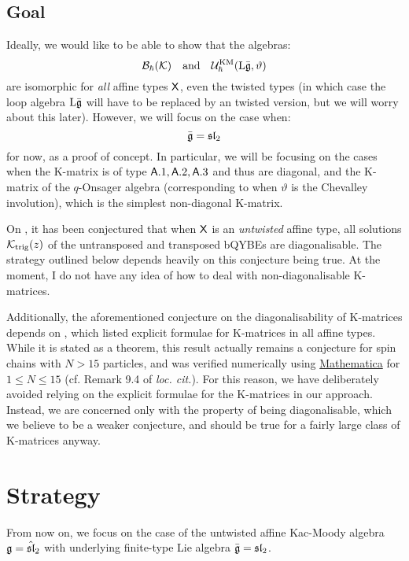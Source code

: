         \subsection{Goal}
            Ideally, we would like to be able to show that the algebras:
                $$\mathcal{B}_{\hbar}(\mathcal{K}) \quad \text{and} \quad \mathcal{U}_{\hbar}^{\mathrm{KM}}(\mathrm{L} \bar{\mathfrak{g}}, \vartheta)$$
            are isomorphic for \textit{all} affine types $\mathsf{X}$, even the twisted types (in which case the loop algebra $\mathrm{L} \bar{\mathfrak{g}}$ will have to be replaced by an twisted version, but we will worry about this later). However, we will focus on the case when:
                $$\bar{\mathfrak{g}} = \mathfrak{sl}_2$$
            for now, as a proof of concept. In particular, we will be focusing on the cases when the K-matrix is of type $\mathsf{A}.1, \mathsf{A}.2, \mathsf{A}.3$ and thus are diagonal, and the K-matrix of the $q$-Onsager algebra (corresponding to when $\vartheta$ is the Chevalley involution), which is the simplest non-diagonal K-matrix.
            \begin{remark}
                On \cite[p. 60]{regelskis_vlaar_reflection_matrices_coideal_subalgebras}, it has been conjectured that when $\mathsf{X}$ is an \textit{untwisted} affine type, all solutions $\mathcal{K}_{\mathrm{trig}}(z)$ of the untransposed and transposed bQYBEs are diagonalisable. The strategy outlined below depends heavily on this conjecture being true. At the moment, I do not have any idea of how to deal with non-diagonalisable K-matrices.

                Additionally, the aforementioned conjecture on the diagonalisability of K-matrices depends on \cite[Theorem 9.3]{regelskis_vlaar_reflection_matrices_coideal_subalgebras}, which listed explicit formulae for K-matrices in all affine types. While it is stated as a theorem, this result actually remains a conjecture for spin chains with $N > 15$ particles, and was verified numerically using \url{Mathematica} for $1 \leq N \leq 15$ (cf. Remark 9.4 of \textit{loc. cit.}). For this reason, we have deliberately avoided relying on the explicit formulae for the K-matrices in our approach. Instead, we are concerned only with the property of being diagonalisable, which we believe to be a weaker conjecture, and should be true for a fairly large class of K-matrices anyway.
            \end{remark}

    \section{Strategy}
        From now on, we focus on the case of the untwisted affine Kac-Moody algebra $\mathfrak{g} = \hat{\mathfrak{sl}}_2$ with underlying finite-type Lie algebra $\bar{\mathfrak{g}} = \mathfrak{sl}_2$.


